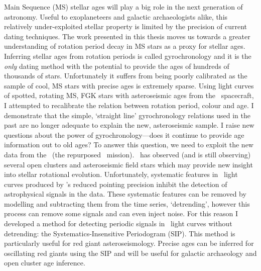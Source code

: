 %
%
%

Main Sequence (MS) stellar ages will play a big role in the next generation of
astronomy.
Useful to exoplaneteers and galactic archaeologists alike, this relatively
under-exploited stellar property is limited by the precision of current dating
techniques.
The work presented in this thesis moves us towards a greater understanding of
rotation period decay in MS stars as a proxy for stellar ages.
Inferring stellar ages from rotation periods is called gyrochronology and it
is the {\it only} dating method with the potential to provide the ages of
hundreds of thousands of stars.
Unfortunately it suffers from being poorly calibrated as the sample of cool,
MS stars with precise ages is extremely sparse.
Using light curves of spotted, rotating MS, FGK stars with asteroseismic ages
from the \kepler\ spacecraft, I attempted to recalibrate the relation between
rotation period, colour and age.
I demonstrate that the simple, `straight line' gyrochronology relations used
in the past are no longer adequate to explain the new, asteroseismic sample.
I raise new questions about the power of gyrochronology---does it continue to
provide age information out to old ages?
To answer this question, we need to exploit the new data from the \ktwo\ (the
repurposed \kepler\ mission).
\ktwo\ has observed (and is still observing) several open clusters and
asteroseismic field stars which may provide new insight into stellar
rotational evolution.
Unfortunately, systematic features in \ktwo\ light curves produced by
\kepler's reduced pointing precision inhibit the detection of astrophysical
signals in the data.
These systematic features can be removed by modelling and subtracting them
from the time series, `detrending', however this process can remove some
signals and can even inject noise.
For this reason I developed a method for detecting periodic signals in \ktwo\
light curves without detrending: the Systematics-Insensitive Periodogram
(SIP).
This method is particularly useful for red giant asteroseismology.
Precise ages can be inferred for oscillating red giants using the SIP and will
be useful for galactic archaeology and open cluster age inference.
